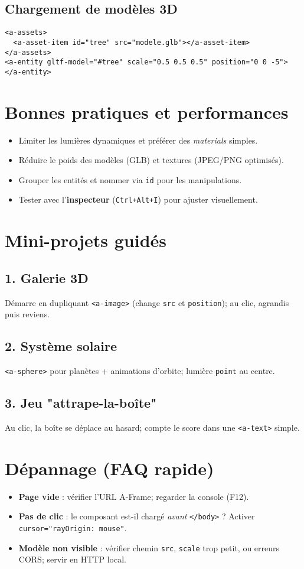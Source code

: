 \documentclass[12pt]{article}
\begin{document}
\subsection{Chargement de modèles 3D}
\begin{verbatim}
<a-assets>
  <a-asset-item id="tree" src="modele.glb"></a-asset-item>
</a-assets>
<a-entity gltf-model="#tree" scale="0.5 0.5 0.5" position="0 0 -5"></a-entity>
\end{verbatim}

\section{Bonnes pratiques et performances}
\begin{itemize}
  \item Limiter les lumières dynamiques et préférer des \textit{materials} simples.
  \item Réduire le poids des modèles (GLB) et textures (JPEG/PNG optimisés).
  \item Grouper les entités et nommer via \texttt{id} pour les manipulations.
  \item Tester avec l'\textbf{inspecteur} (\texttt{Ctrl+Alt+I}) pour ajuster visuellement.
\end{itemize}

\section{Mini-projets guidés}
\subsection*{1. Galerie 3D}
Démarre en dupliquant \texttt{<a-image>} (change \texttt{src} et \texttt{position}); au clic, agrandis puis reviens.
\subsection*{2. Système solaire}
\texttt{<a-sphere>} pour planètes + animations d'orbite; lumière \texttt{point} au centre.
\subsection*{3. Jeu "attrape-la-boîte"}
Au clic, la boîte se déplace au hasard; compte le score dans une \texttt{<a-text>} simple.

\section{Dépannage (FAQ rapide)}
\begin{itemize}
  \item \textbf{Page vide} : vérifier l'URL A-Frame; regarder la console (F12).
  \item \textbf{Pas de clic} : le composant est-il chargé \emph{avant} \texttt{</body>} ? Activer \texttt{cursor="rayOrigin: mouse"}.
  \item \textbf{Modèle non visible} : vérifier chemin \texttt{src}, \texttt{scale} trop petit, ou erreurs CORS; servir en HTTP local.
\end{itemize}
\end{document}
